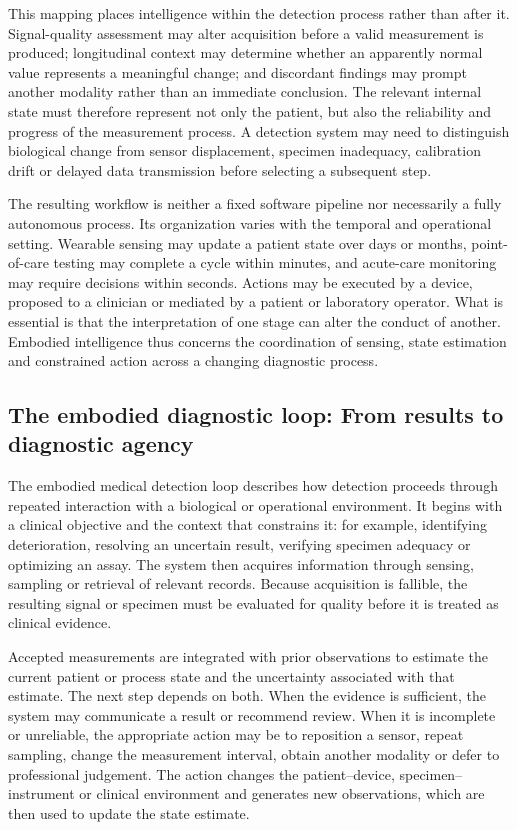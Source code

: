 \documentclass[12pt,a4paper]{article}
\begin{document}
This mapping places intelligence within the detection process rather than
after it. Signal-quality assessment may alter acquisition before a valid
measurement is produced; longitudinal context may determine whether an
apparently normal value represents a meaningful change; and discordant
findings may prompt another modality rather than an immediate conclusion.
The relevant internal state must therefore represent not only the patient,
but also the reliability and progress of the measurement process. A
detection system may need to distinguish biological change from sensor
displacement, specimen inadequacy, calibration drift or delayed data
transmission before selecting a subsequent step.

The resulting workflow is neither a fixed software pipeline nor necessarily
a fully autonomous process. Its organization varies with the temporal and
operational setting. Wearable sensing may update a patient state over days
or months, point-of-care testing may complete a cycle within minutes, and
acute-care monitoring may require decisions within seconds. Actions may be
executed by a device, proposed to a clinician or mediated by a patient or
laboratory operator. What is essential is that the interpretation of one
stage can alter the conduct of another. Embodied intelligence thus concerns
the coordination of sensing, state estimation and constrained action across
a changing diagnostic process.


\subsection{The embodied diagnostic loop: From results to diagnostic agency}
\label{subsec:embodied_medical_detection_loop}

The embodied medical detection loop describes how detection proceeds through
repeated interaction with a biological or operational environment. It begins
with a clinical objective and the context that constrains it: for example,
identifying deterioration, resolving an uncertain result, verifying specimen
adequacy or optimizing an assay. The system then acquires information through
sensing, sampling or retrieval of relevant records. Because acquisition is
fallible, the resulting signal or specimen must be evaluated for quality
before it is treated as clinical evidence.

Accepted measurements are integrated with prior observations to estimate the
current patient or process state and the uncertainty associated with that
estimate. The next step depends on both. When the evidence is sufficient,
the system may communicate a result or recommend review. When it is
incomplete or unreliable, the appropriate action may be to reposition a
sensor, repeat sampling, change the measurement interval, obtain another
modality or defer to professional judgement. The action changes the
patient--device, specimen--instrument or clinical environment and generates
new observations, which are then used to update the state estimate.
\end{document}
